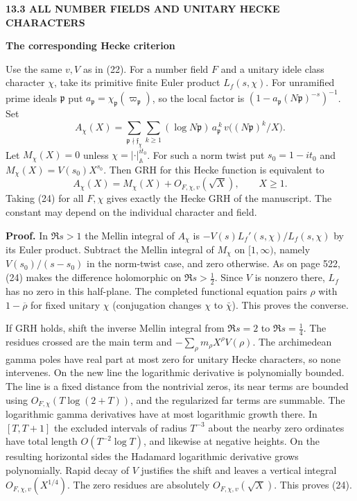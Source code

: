 \documentclass[11pt,letterpaper]{article}
\newcommand{\rightmarktext}{}
\newcommand{\printfolio}{}
\newcommand{\leaf}[4]{\clearpage\gdef\printfolio{#1}\gdef\rightmarktext{#2}%
  {\small\sffamily\bfseries\color{ink}#3\par}\vspace{3pt}%
  {\LARGE\bfseries #4\par}\vspace{5pt}}
\newcommand{\point}[1]{\par\smallskip\textbf{#1.}\enspace\ignorespaces}
\newcommand{\A}{\mathbb A}
\begin{document}
\leaf{522a}{Hecke prime sums}{13.3 \quad ALL NUMBER FIELDS AND UNITARY HECKE CHARACTERS}{The corresponding Hecke criterion}
Use the same $v,V$ as in (22). For a number field $F$ and a unitary
idele class character $\chi$, take its primitive finite Euler product
$L_f(s,\chi)$. For unramified prime ideals $\mathfrak p$ put
$a_{\mathfrak p}=\chi_{\mathfrak p}(\varpi_{\mathfrak p})$, so the local
factor is $(1-a_{\mathfrak p}(N\mathfrak p)^{-s})^{-1}$. Set
\[
 A_\chi(X)=\sum_{\mathfrak p\nmid\mathfrak f_\chi}\sum_{k\ge1}
    (\log N\mathfrak p)\,a_{\mathfrak p}^{\,k}\,
           v\big((N\mathfrak p)^k/X\big).
\]
Let $M_\chi(X)=0$ unless $\chi=|\cdot|_\A^{it_0}$. For such a norm twist
put $s_0=1-it_0$ and $M_\chi(X)=V(s_0)X^{s_0}$.
Then GRH for this Hecke function is equivalent to
\[
             A_\chi(X)=M_\chi(X)+O_{F,\chi,v}(\sqrt X),\qquad X\ge1.
 \tag{24}
\]
Taking (24) for all $F,\chi$ gives exactly the Hecke GRH of the manuscript.
The constant may depend on the individual character and field.

\point{Proof} In $\Re s>1$ the Mellin integral of $A_\chi$ is
$-V(s)L_f'(s,\chi)/L_f(s,\chi)$ by its Euler product. Subtract the
Mellin integral of $M_\chi$ on $[1,\infty)$, namely $V(s_0)/(s-s_0)$
in the norm-twist case, and zero otherwise. As on page 522, (24) makes
the difference holomorphic on $\Re s>\tfrac12$. Since $V$ is nonzero
there, $L_f$ has no zero in this half-plane. The completed functional
equation pairs $\rho$ with $1-\overline\rho$ for fixed unitary $\chi$
(conjugation changes $\chi$ to $\bar\chi$). This proves the converse.

If GRH holds, shift the inverse Mellin integral from $\Re s=2$ to
$\Re s=\tfrac14$. The residues crossed are the main term and
$-\sum_\rho m_\rho X^\rho V(\rho)$. The archimedean gamma poles have
real part at most zero for unitary Hecke characters, so none intervenes.
On the new line the logarithmic derivative is polynomially bounded.
The line is a fixed distance from the nontrivial zeros,
its near terms are bounded using $O_{F,\chi}(T\log(2+T))$, and the
regularized far terms are summable. The logarithmic gamma derivatives
have at most logarithmic growth there. In $[T,T+1]$ the excluded intervals
of radius $T^{-3}$ about the nearby zero ordinates have total length
$O(T^{-2}\log T)$, and likewise at negative heights. On the resulting
horizontal sides the Hadamard logarithmic derivative grows polynomially.
Rapid decay of $V$ justifies the shift and leaves a vertical
integral $O_{F,\chi,v}(X^{1/4})$. The zero residues are absolutely
$O_{F,\chi,v}(\sqrt X)$. This proves (24).
\end{document}
